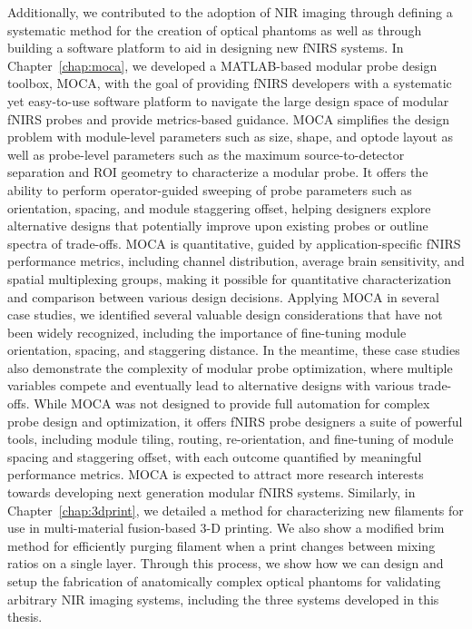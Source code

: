 Additionally, we contributed to the adoption of \ac{NIR} imaging through defining a systematic method for the creation of optical phantoms as well as through building a software platform to aid in designing new \ac{fNIRS} systems. In Chapter~\ref{chap:moca}, we developed a MATLAB-based modular probe design toolbox, \ac{MOCA}, with the goal of providing \ac{fNIRS} developers with a systematic yet easy-to-use software platform to navigate the large design space of modular \ac{fNIRS} probes and provide metrics-based guidance. \ac{MOCA} simplifies the design problem with module-level parameters such as size, shape, and optode layout as well as probe-level parameters such as the maximum source-to-detector separation and ROI geometry to characterize a modular probe. It offers the ability to perform operator-guided sweeping of probe parameters such as orientation, spacing, and module staggering offset, helping designers explore alternative designs that potentially improve upon existing probes or outline spectra of trade-offs. \ac{MOCA} is quantitative, guided by application-specific \ac{fNIRS} performance metrics, including channel distribution, average brain sensitivity, and spatial multiplexing groups, making it possible for quantitative characterization and comparison between various design decisions. Applying \ac{MOCA} in several case studies, we identified several valuable design considerations that have not been widely recognized, including the importance of fine-tuning module orientation, spacing, and staggering distance. In the meantime, these case studies also demonstrate the complexity of modular probe optimization, where multiple variables compete and eventually lead to alternative designs with various trade-offs. While \ac{MOCA} was not designed to provide full automation for complex probe design and optimization, it offers \ac{fNIRS} probe designers a suite of powerful tools, including module tiling, routing, re-orientation, and fine-tuning of module spacing and staggering offset, with each outcome quantified by meaningful performance metrics. \ac{MOCA} is expected to attract more research interests towards developing next generation modular \ac{fNIRS} systems. Similarly, in Chapter~\ref{chap:3dprint}, we detailed a method for characterizing new filaments for use in multi-material fusion-based 3-D printing. We also show a modified brim method for efficiently purging filament when a print changes between mixing ratios on a single layer. Through this process, we show how we can design and setup the fabrication of anatomically complex optical phantoms for validating arbitrary \ac{NIR} imaging systems, including the three systems developed in this thesis.


